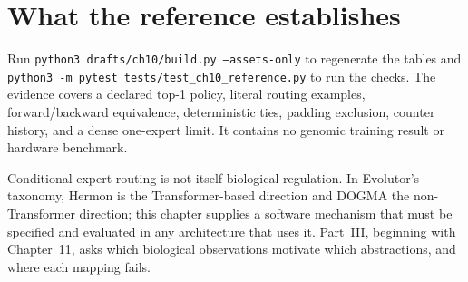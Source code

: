 \section{What the reference establishes}
Run \texttt{python3 drafts/ch10/build.py --assets-only} to regenerate the
tables and \texttt{python3 -m pytest tests/test\_ch10\_reference.py} to run the
checks. The evidence covers a declared top-1 policy, literal routing examples,
forward/backward equivalence, deterministic ties, padding exclusion,
counter history, and a dense one-expert limit. It contains no genomic training
result or hardware benchmark.

Conditional expert routing is not itself biological regulation. In Evolutor's
taxonomy, Hermon is the Transformer-based direction and DOGMA the
non-Transformer direction; this chapter supplies a software mechanism that
must be specified and evaluated in any architecture that uses it. Part~III, beginning
with Chapter~11, asks which biological observations motivate which abstractions,
and where each mapping fails.

